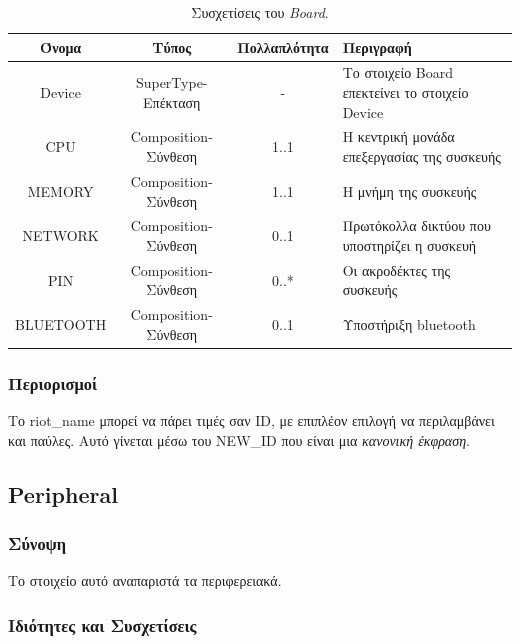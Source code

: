 \begin{table}[H]
	\begin{center}
		\caption{Συσχετίσεις του \textit{Board}.}
		\label{tab:board2}
		\begin{tabular}{ | c | c | c| m{5.5cm} | }
			\hline
			\rowcolor{Gray}
			Όνομα & Τύπος & Πολλαπλότητα & Περιγραφή \\
			\hline
			Device & SuperType-Επέκταση & - &  Το στοιχείο Board επεκτείνει το στοιχείο Device \\
			\hline
			CPU & Composition-Σύνθεση & 1..1 &  Η κεντρική μονάδα επεξεργασίας της συσκευής \\
			\hline
			MEMORY & Composition-Σύνθεση & 1..1 &  Η μνήμη της συσκευής \\
			\hline
			NETWORK & Composition-Σύνθεση & 0..1 &  Πρωτόκολλα δικτύου που υποστηρίζει η συσκευή \\
			\hline
			PIN & Composition-Σύνθεση & 0..* &  Οι ακροδέκτες της συσκευής \\
			\hline
			BLUETOOTH & Composition-Σύνθεση & 0..1 &  Υποστήριξη bluetooth \\
			\hline
		\end{tabular}
	\end{center}
\end{table}

\subsubsection*{Περιορισμοί}

\noindent Το riot\_name μπορεί να πάρει τιμές σαν ID, με επιπλέον επιλογή να περιλαμβάνει και παύλες. Αυτό γίνεται μέσω του NEW\_ID που είναι μια \textit{κανονική έκφραση}.

\subsection{Peripheral}
\label{subsec:peripheral}

\subsubsection*{Σύνοψη}

\noindent Το στοιχείο αυτό αναπαριστά τα περιφερειακά.

\subsubsection*{Ιδιότητες και Συσχετίσεις}

